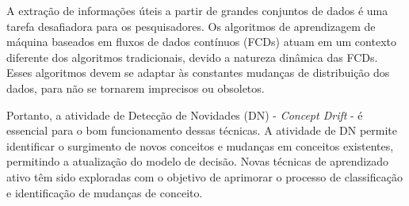 \documentclass[qual, classic, a4paper]{ufbathesis}
\begin{document}
A extração de informações úteis a partir de grandes conjuntos de dados é uma tarefa desafiadora para os pesquisadores.
Os algoritmos de aprendizagem de máquina baseados em fluxos de dados contínuos (FCDs) atuam em um contexto diferente dos algoritmos tradicionais, 
devido a natureza dinâmica das FCDs.
Esses algoritmos devem se adaptar às constantes mudanças de distribuição dos dados, para não se tornarem imprecisos ou obsoletos.

Portanto, a atividade de Detecção de Novidades (DN) - \textit{Concept Drift} - é essencial para o bom funcionamento dessas técnicas. A atividade de DN permite identificar o surgimento de novos conceitos e mudanças em conceitos existentes, permitindo a atualização do modelo de decisão. Novas técnicas de aprendizado ativo têm sido exploradas com o objetivo de aprimorar o processo de classificação e identificação de mudanças de conceito. 






\end{document}
